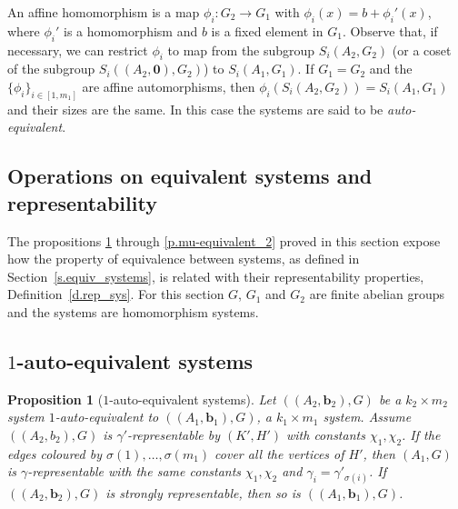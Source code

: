 \documentclass[10pt]{article}
\newtheorem{proposition}[theorem]{Proposition}
\begin{document}
An affine homomorphism is a map $\phi_i:G_2\to G_1$ with $\phi_i(x)=b+\phi_i'(x)$, where $\phi_i'$ is a homomorphism and $b$ is a fixed element in $G_1$. 
Observe that, if necessary, we can restrict $\phi_i$ to map from the subgroup $S_i(A_2,G_2)$ (or a coset of the subgroup $S_i((A_2,\mathbf{0}),G_2)$) to $S_i(A_1,G_1)$.
If $G_1=G_2$ and the $\{\phi_i\}_{i\in [1,m_1]}$ are affine automorphisms, then $\phi_i\left( S_i(A_2,G_2)\right)=S_i(A_1,G_1)$ and their sizes are the same. In this case the systems are said to be \emph{auto-equivalent}.







\subsection{Operations on equivalent systems and representability} \label{s.oper_between_representable}

The propositions \ref{p.1-auto-equiv-rep} through \ref{p.mu-equivalent_2} proved in this section expose how the property of equivalence between systems, as defined in Section~\ref{s.equiv_systems}, is related with their representability properties, Definition~\ref{d.rep_sys}. For this section $G$, $G_1$ and $G_2$ are finite abelian groups and the systems are homomorphism systems. 



\subsection{$1$-auto-equivalent systems}

\begin{proposition}[$1$-auto-equivalent systems]\label{p.1-auto-equiv-rep}
	Let $((A_2,\mathbf{b}_2),G)$ be a $k_2\times m_2$ system $1$-auto-equivalent to $((A_1,\mathbf{b}_1),G)$, a $k_1\times m_1$ system. Assume $((A_2,b_2),G)$ is $\gamma'$-representable by $(K',H')$ with constants $\chi_1,\chi_2$. If the edges coloured by $\sigma(1),\ldots,\sigma(m_1)$ cover all the vertices of $H'$, then  $(A_1,G)$ is $\gamma$-representable %
	with the same constants $\chi_1,\chi_2$ and $\gamma_i=\gamma'_{\sigma(i)}$. If $((A_2,\mathbf{b}_2),G)$ is strongly representable, then so is $((A_1,\mathbf{b}_1),G)$.
\end{proposition}
\end{document}
